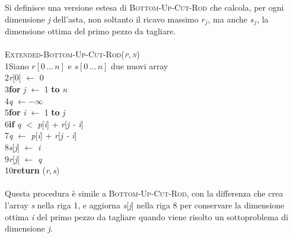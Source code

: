 \documentclass[10pt, a4paper]{report}
\newcommand\firsttab[1][0.5cm]{\hspace*{#1}}
\newcommand\secondtab[1][1cm]{\hspace*{#1}}
\newcommand\thirdtab[1][1.5cm]{\hspace*{#1}}
\newcommand\fourthtab[1][2cm]{\hspace*{#1}}
\begin{document}
Si definisce una versione estesa di \textsc{Bottom-Up-Cut-Rod} che calcola, per ogni dimensione \textit{j} dell'asta, non soltanto il ricavo massimo $r_j$, ma anche $s_j$, la dimensione ottima del primo pezzo da tagliare.\\\\
\textsc{Extended-Bottom-Up-Cut-Rod(\textit{p},\,\textit{n})}\\
1\firsttab Siano $r[0\,...\,n]$ e $s[0\,...\,n]$ due nuovi array\\
2\firsttab\textit{r}[0] $\leftarrow$ 0\\
3\firsttab\textbf{for} \textit{j} $\leftarrow$ 1 \textbf{to} \textit{n}\\
4\secondtab\textit{q} $\leftarrow - \infty$\\
5\secondtab\textbf{for} \textit{i} $\leftarrow$ 1 \textbf{to} \textit{j}\\
6\thirdtab\textbf{if} \textit{q} $<$ \textit{p}[\textit{i}] + \textit{r}[\textit{j - i}]\\
7\fourthtab\textit{q} $\leftarrow$ \textit{p}[\textit{i}] + \textit{r}[\textit{j - i}]\\
8\fourthtab\textit{s}[\textit{j}] $\leftarrow$ \textit{i}\\
9\secondtab\textit{r}[\textit{j}] $\leftarrow$ \textit{q}\\
10\firsttab\textbf{return} (\textit{r},\,\textit{s})\\\\
Questa procedura è simile a \textsc{Bottom-Up-Cut-Rod}, con la differenza che crea l'array \textit{s} nella riga 1, e aggiorna \textit{s}[\textit{j}] nella riga 8 per conservare la dimensione ottima \textit{i} del primo pezzo da tagliare quando viene risolto un sottoproblema di dimensione \textit{j}.
\end{document}
